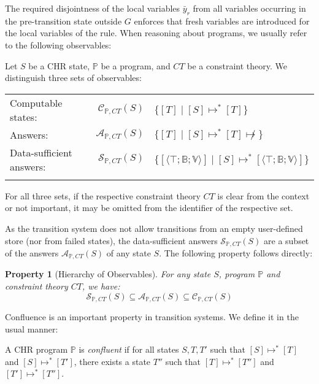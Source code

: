\documentclass[acmtocl]{acmtrans2m}
\newtheorem{property}[theorem]{Property}
\newcommand\state[1]{\langle #1 \rangle}
\newcommand{\bbP}{\ensuremath{\mathbb{P}}}
\newcommand{\B}{\ensuremath{\mathbb{B}}}
\newcommand{\V}{\ensuremath{\mathbb{V}}}
\newcommand{\cA}{\ensuremath{\mathcal{A}}}
\newcommand{\cS}{\ensuremath{\mathcal{S}}}
\newcommand{\cC}{\ensuremath{\mathcal{C}}}
\newcommand{\by}{\bar{y}}
\begin{document}
The required disjointness of the local variables $\by_r$ from all variables
occurring in the pre-transition state outside $G$ enforces that fresh variables
are introduced for the local variables of the rule. When reasoning about
programs, we usually refer to the following observables:

\begin{definition}
\label{def:observables}
Let $S$ be a CHR state, $\bbP$ be a program, and $CT$ be a constraint theory. We
distinguish three sets of observables:

\begin{tabular}{l @{\quad} r @{$\,::=\,$} l}
\\
Computable states:  & $\cC_{\bbP,CT}(S)$ &
$\{[T]\mid [S]\mapsto^*[T]\}$ \\
Answers: & $\cA_{\bbP,CT}(S)$ &
$\{[T]\mid [S]\mapsto^*[T]\not\mapsto\}$ \\
Data-sufficient answers: & $\cS_{\bbP,CT}(S)$ &
$\{[\state{\top;\B;\V}]\mid [S]\mapsto^*[\state{\top;\B;\V}]\}$ \\
\\
\end{tabular}

For all three sets, if the respective constraint theory $CT$ is clear from the
context or not important, it may be omitted from the  identifier of the
respective set.
\end{definition}

As the transition system does not allow transitions from an empty user-defined
store (nor from failed states), the data-sufficient answers
$\cS_{\bbP,CT}(S)$ are a subset of the answers $\cA_{\bbP,CT}(S)$ of any state
$S$. The following property follows directly:

\begin{property}[Hierarchy of Observables]
For any state $S$, program $\bbP$ and constraint theory $CT$, we have:
\[
\cS_{\bbP,CT}(S) \subseteq \cA_{\bbP,CT}(S) \subseteq \cC_{\bbP,CT}(S)
\]
\end{property}

Confluence is an important property in transition systems. We define it in the
usual manner:

\begin{definition}[Confluence]
\label{def:confluence}
A CHR program $\bbP$ is \emph{confluent} if for all states $S,T,T'$ such that
$[S]\mapsto^* [T]$ and $[S]\mapsto^* [T']$, there exists a state $T''$ such that
$[T]\mapsto^* [T'']$ and $[T']\mapsto^* [T'']$.
\end{definition}
\end{document}
